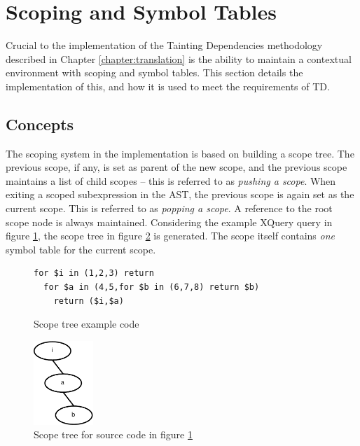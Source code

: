 \section{Scoping and Symbol Tables}
Crucial to the implementation of the Tainting Dependencies methodology
described in Chapter \ref{chapter:translation} is the ability to
maintain a contextual environment with scoping and symbol tables. This section
details the implementation of this, and how it is used to meet the
requirements of TD.

\subsection{Concepts}
The scoping system in the implementation is based on building a scope tree. The
previous scope, if any, is set as parent of the new scope, and the previous
scope maintains a list of child scopes -- this is referred to as
\textit{pushing a scope}. When exiting a scoped subexpression in the AST, the
previous scope is again set as the current scope. This is referred to as
\textit{popping a scope}. A reference to the root scope node is always
maintained. Considering the example XQuery query in figure
\ref{fig:impl:scope_tree_ex_code}, the scope tree in figure
\ref{fig:impl:scope_tree_ex} is generated. The scope itself contains \emph{one}
symbol table for the current scope.

\begin{figure}[!htp]
\begin{center}
\begin{minipage}[h]{9cm}
\begin{verbatim}
for $i in (1,2,3) return 
  for $a in (4,5,for $b in (6,7,8) return $b) 
    return ($i,$a)
\end{verbatim}
  \caption{Scope tree example code}
  \label{fig:impl:scope_tree_ex_code}
  \end{minipage}
\end{center}
\end{figure}

\begin{figure}[!htp]
\begin{center}
  \includegraphics[width=0.2\textwidth]{diagrams/scope_tree_ex}
  \caption{Scope tree for source code in figure
  \ref{fig:impl:scope_tree_ex_code}} 
  \label{fig:impl:scope_tree_ex}
\end{center}
\end{figure}

